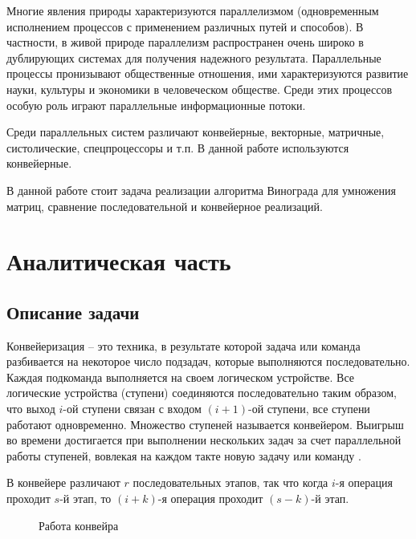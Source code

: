\documentclass[a4paper,12pt]{article}
\begin{document}
Многие явления природы характеризуются параллелизмом (одновременным исполнением процессов с применением различных путей и способов). В частности, в живой природе параллелизм распространен очень широко в дублирующих системах для получения надежного результата. Параллельные процессы пронизывают общественные отношения, ими характеризуются развитие науки, культуры и экономики в человеческом обществе. Среди этих процессов особую роль играют параллельные информационные потоки. \cite{Conveer}

Среди параллельных систем различают конвейерные, векторные, матричные, систолические, спецпроцессоры и т.п. В данной работе используются конвейерные. \cite{Korneev}

В данной работе стоит задача реализации алгоритма Винограда для умножения матриц, сравнение последовательной и конвейерное реализаций.

\newpage
\section{Аналитическая часть}

\subsection{Описание задачи}

Конвейеризация – это техника, в результате которой  задача или  команда разбивается  на некоторое число подзадач, которые  выполняются последовательно. Каждая  подкоманда   выполняется на своем логическом  устройстве.    Все     логические    устройства   (ступени)  соединяются последовательно таким образом, что выход  $i$-ой   ступени   связан   с   входом   $(i+1)$-ой   ступени,  все ступени  работают  одновременно.  Множество  ступеней называется    конвейером.    Выигрыш     во    времени достигается при  выполнении  нескольких задач  за  счет параллельной   работы   ступеней,  вовлекая  на  каждом такте новую задачу или команду \cite{Conveer}.

В конвейере различают $r$ последовательных этапов, так что когда $i$-я операция
проходит $s$-й этап, то $(i+k)$-я операция проходит $(s-k)$-й этап.

\begin{figure}[H]
    \caption{Работа конвейра}
    \label{img:conveer}
\end{figure}
\end{document}

